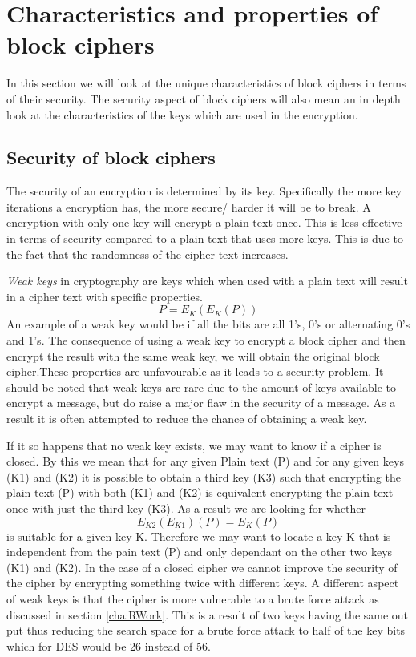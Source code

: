 \documentclass[11pt,a4paper]{report}
\begin{document}
\section{Characteristics and properties of block ciphers}
In this section we will look at the unique characteristics of block ciphers in terms of their security. The security aspect of block ciphers will also mean an in depth look at the characteristics of the keys which are used in the encryption. 

\subsection{Security of block ciphers}
The security of an encryption is determined by its key. Specifically the more key iterations a encryption has, the more secure/ harder it will be to break. A encryption with only one key will encrypt a plain text once. This is less effective in terms of security compared to a plain text that uses more keys. This is due to the fact that the randomness of the cipher text increases.

\emph{Weak keys} in cryptography are keys which when used with a plain text will result in a cipher text with specific properties. 
\begin{displaymath}
P = E_{K}(E_{K}(P))
\end{displaymath}
An example of a weak key would be if all the bits are all 1's, 0's or alternating 0's and 1's. The consequence of using a weak key to encrypt a block cipher and then encrypt the result with the same weak key, we will obtain the original block cipher.These properties are unfavourable as it leads to a security problem. It should be noted that weak keys are rare due to the amount of keys available to encrypt a message, but do raise a major flaw in the security of a message. As a result it is often attempted to reduce the chance of obtaining a weak key.

If it so happens that no weak key exists, we may want to know if a cipher is closed. By this we mean that for any given Plain text (P) and for any given keys (K1) and (K2) it is possible to obtain a third key (K3) such that encrypting the plain text (P) with both (K1) and (K2) is equivalent encrypting the plain text once with just the third key (K3). As a result we are looking for whether
\begin{displaymath}
E_{K2}(E_{K1})(P) = E_{K}(P)
\end{displaymath} 
is suitable for a given key K. Therefore we may want to locate a key K that is independent from the pain text (P) and only dependant on the other two keys (K1) and (K2). In the case of a closed cipher we cannot improve the security of the cipher by encrypting something twice with different keys. A different aspect of weak keys is that the cipher is more vulnerable to a brute force attack as discussed in section \ref{cha:RWork}. This is a result of two keys having the same out put thus reducing the search space for a brute force attack to half of the key bits which for DES would be 26 instead of 56. 
\end{document}
